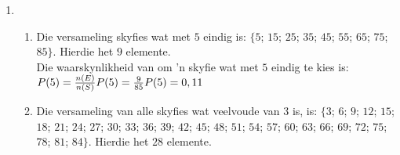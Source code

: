 \begin{solutions}{}
{\begin{enumerate}[itemsep=5pt, label=\textbf{\arabic*}. ]
\begin{enumerate}[noitemsep, label=\textbf{(\alph*)} ]
    \item 
Die waarskynlikheid van om 'n kind wat 4 jaar oud en manlike is te kies is:\\
    $P(\mbox{manlik}) = \frac{7}{30}\\
	      = 0,23$

    \item Daar is $6 + 2 + 5 + 7 = 20$ kinders wat van 3 of 4 is.\\
    
Die waarskynlikheid van om 'n kind van 3 of 4 is ewekansig te kies is:\\
    $\frac{20}{30} = 0,67$

    \item 'n kind kan nie 3 \textsl{en} 4 wees nie dus is die waarskylikeheid $0$.

    \item Dit is dieselfde asof 'n ewekansig kinder óf 3 óf 4 is, en dus is  $0,67$.

    \item Die waarskynlikheid dat 'n kind óf 3 óf vroulik is, is:\\
    $P(3 \cup \mbox{vroulik}) = P(3) + P(\mbox{vroulik}) - P(3 \cap \mbox{vroulik})\\
		      = \frac{10}{30} + 0,5 - \frac{10}{30} \times \frac{15}{30}\\
		      = 0,67$
    \end{enumerate}
    
\item %
    \begin{enumerate}[noitemsep, label=\textbf{(\alph*)} ]
    \item Die versameling skyfies wat met $5$ eindig is: $\{5$; $15$; $25$; $35$; $45$; $55$; $65$; $75$; $85\}$. Hierdie het $9$ elemente.\\
 
    Die waarskynlikheid van om 'n skyfie wat met $5$ eindig te kies is:\\
    $P(5) = \frac{n(E)}{n(S)}\\
     P(5) = \frac{9}{85}\\
     P(5) = 0,11$

    \item Die versameling van alle skyfies wat veelvoude van $3$ is, is: $\{3$; $6$; $ 9$; $ 12$; $ 15$; $ 18$; $ 21$; $ 24$; $ 27$; $ 30$; $ 33$; $ 36$; $ 39$; $ 42$; $ 45$; $ 48$; $ 51$; $ 54$; $ 57$; $ 60$; $ 63$; $ 66$; $ 69$; $ 72$; $ 75$; $ 78$; $ 81$; $ 84\}$. Hierdie het $28$ elemente.\\
 

\end{enumerate}
\end{enumerate}}
\end{solutions}
